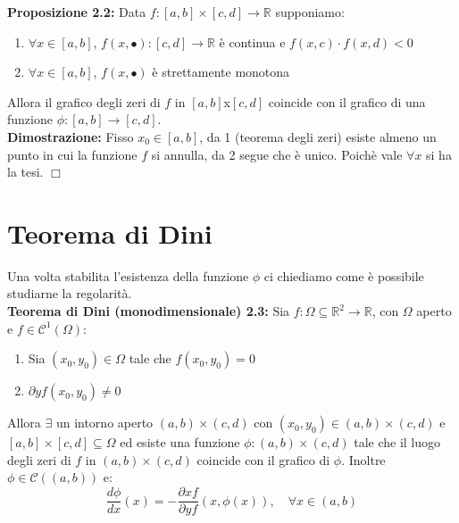 \documentclass[a4paper,11pt,titlepage]{book}
\begin{document}
\textbf{Proposizione 2.2:} Data $f:[a,b]\times[c,d]\to\mathbb{R}$ supponiamo:\begin{enumerate}
\item $\forall x \in [a,b]$, $f(x,\bullet):[c,d]\to\mathbb{R}$ è continua e $f(x,c)\cdot f(x,d)<0$
\item $\forall x \in [a,b]$, $f(x,\bullet)$ è strettamente monotona
\end{enumerate}
Allora il grafico degli zeri di $f$ in $[a,b]$x$[c,d]$ coincide con il grafico di una funzione $\phi: [a,b]\to[c,d]$.\\

\textbf{Dimostrazione:} Fisso $x_0\in[a,b]$, da 1 (teorema degli zeri) esiste almeno un punto in cui la funzione $f$ si annulla, da 2 segue che è unico. Poichè vale $\forall x$ si ha la tesi. $\Box$ \\

\section{Teorema di Dini}

Una volta stabilita l'esistenza della funzione $\phi$ ci chiediamo come è possibile studiarne la regolarità. \\

\textbf{Teorema di Dini (monodimensionale) 2.3:} Sia $f:\Omega\subseteq\mathbb{R}^2\to\mathbb{R}$, con $\Omega$ aperto e $f\in\mathcal{C}^1(\Omega)$:
\begin{enumerate}
\item Sia $(x_0,y_0)\in\Omega$ tale che $f(x_0,y_0)=0$
\item $\partial y f(x_0,y_0)\ne 0$
\end{enumerate}

Allora $\exists$ un intorno aperto $(a,b)\times(c,d)$ con $(x_0,y_0)\in(a,b)\times (c,d)$ e $[a,b]\times[c,d]\subseteq\Omega$ ed esiste una funzione $\phi:(a,b)\times(c,d)$ tale che il luogo degli zeri di $f$ in $(a,b)\times(c,d)$ coincide con il grafico di $\phi$. Inoltre $\phi\in\mathcal{C}((a,b))$ e: $$\frac{d\phi}{dx}(x)= - \frac{\partial xf}{\partial yf} (x,\phi(x)),\quad \forall x \in (a,b)$$
\end{document}
